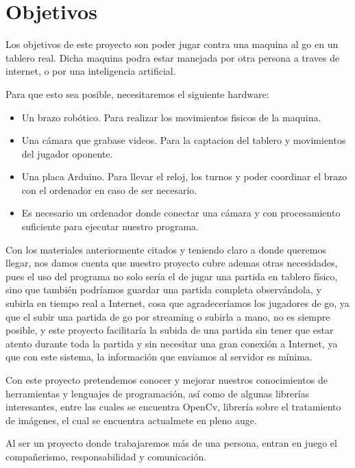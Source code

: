 \documentclass[12pt,a4paper]{report}
\begin{document}
\section{Objetivos} 

Los objetivos de este proyecto son poder jugar contra una maquina al go en un tablero real. Dicha maquina podra estar manejada por otra persona a traves de internet, o por una inteligencia artificial.

Para que esto sea posible, necesitaremos el siguiente hardware:
\begin{itemize}
    \item Un brazo robótico. Para realizar los movimientos fisicos de la maquina.
    \item Una cámara que grabase videos. Para la captacion del tablero y movimientos del jugador oponente.
    \item Una placa Arduino. Para llevar el reloj, los turnos y poder coordinar el brazo con el ordenador en caso de ser necesario. 
    \item Es necesario un ordenador donde conectar una cámara y con
    procesamiento suficiente para ejecutar nuestro programa. 
\end{itemize}

Con los materiales anteriormente citados y teniendo claro a donde queremos llegar, nos damos cuenta que nuestro proyecto cubre ademas otras necesidades, pues el uso del programa no solo sería el de jugar
una partida en tablero físico, sino que también podríamos guardar una partida
completa observándola, y subirla en tiempo real a Internet, cosa que
agradeceríamos los jugadores de go, ya que el subir una partida de go por
streaming o subirla a mano, no es siempre posible, y este proyecto facilitaría
la subida de una partida sin tener que estar atento durante toda la partida y
sin necesitar una gran conexión a Internet, ya que con este sistema, la
información que enviamos al servidor es mínima. 

Con este proyecto pretendemos conocer y mejorar nuestros conocimientos de 
herramientas y lenguajes de programación, así como de algunas librerías
interesantes, entre las cuales se encuentra OpenCv, librería sobre el
tratamiento de imágenes, el cual se encuentra actualmete en pleno auge. 

Al ser un proyecto donde trabajaremos más de una persona, entran en juego el
compañerismo, responsabilidad y comunicación. 
\end{document}
